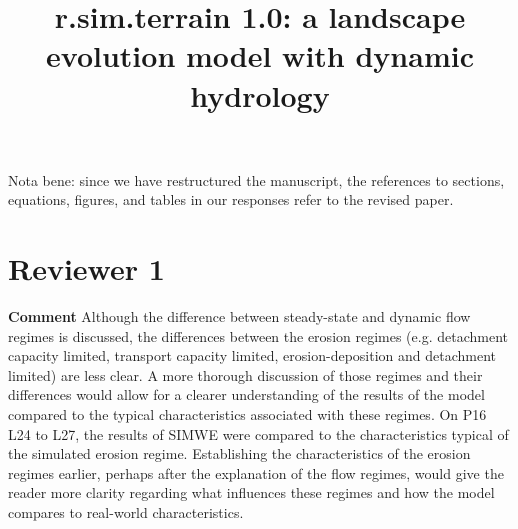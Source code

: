 \documentclass[gmd, manuscript]{copernicus}
\begin{document}
\title{\lowercase{r.sim.terrain 1.0}: a landscape evolution model with dynamic hydrology} 






\received{}
\pubdiscuss{}
\revised{}
\accepted{}
\published{}


\maketitle

\noindent
Nota bene: since we have restructured the manuscript, the references to sections, equations, figures, and tables in our responses refer to the revised paper. 


\section{Reviewer 1}

\noindent\textbf{Comment}
Although the difference between steady-state and dynamic flow regimes is discussed, the differences between the erosion regimes (e.g. detachment capacity limited, transport capacity limited, erosion-deposition and detachment limited) are less clear. A more thorough discussion of those regimes and their differences would allow for a clearer understanding of the results of the model compared to the typical characteristics associated with these regimes. On P16 L24 to L27, the results of SIMWE were compared to the characteristics typical of the simulated erosion regime. Establishing the characteristics of the erosion regimes earlier, perhaps after the explanation of the flow regimes, would give the reader more clarity regarding what influences these regimes and how the model compares to real-world characteristics.
\\
\end{document}
